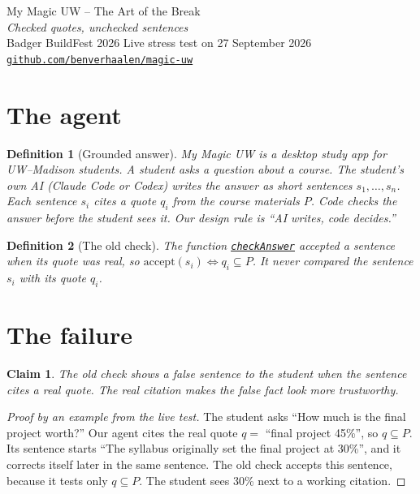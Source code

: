 \documentclass[10pt]{article}
\theoremstyle{card}
\newtheorem{definition}{Definition}
\newtheorem{claim}{Claim}
\newcommand{\repo}{https://github.com/benverhaalen/magic-uw/blob/9fe2f848144c6ff58830d6c5c870277833a679a3}
\newcommand{\gh}[2]{\href{\repo/#1}{\underline{\texttt{#2}}}}
\begin{document}
\small

\begin{center}
{\Large My Magic UW -- The Art of the Break}\\[3pt]
{\itshape Checked quotes, unchecked sentences}\\[2pt]
{\footnotesize Badger BuildFest 2026 \quad Live stress test on 27 September 2026 \quad \href{https://github.com/benverhaalen/magic-uw}{\underline{\texttt{github.com/benverhaalen/magic-uw}}}}
\end{center}

\section{The agent}

\begin{definition}[Grounded answer]
My Magic UW is a desktop study app for UW--Madison students. A student asks a question about a course. The student's own AI (Claude Code or Codex) writes the answer as short sentences $s_1,\dots,s_n$. Each sentence $s_i$ cites a quote $q_i$ from the course materials $P$. Code checks the answer before the student sees it. Our design rule is ``AI writes, code decides.''
\end{definition}

\begin{definition}[The old check]
The function \gh{packages/core/src/intent/ask.ts\#L474}{checkAnswer} accepted a sentence when its quote was real, so $\text{accept}(s_i) \iff q_i \subseteq P$. It never compared the sentence $s_i$ with its quote $q_i$.
\end{definition}

\section{The failure}

\begin{claim}
The old check shows a false sentence to the student when the sentence cites a real quote. The real citation makes the false fact look more trustworthy.
\end{claim}

\vspace{-5pt}\begin{proof}[Proof by an example from the live test]
The student asks ``How much is the final project worth?'' Our agent cites the real quote $q =$ ``final project 45\%'', so $q \subseteq P$. Its sentence starts ``The syllabus originally set the final project at 30\%'', and it corrects itself later in the same sentence. The old check accepts this sentence, because it tests only $q \subseteq P$. The student sees 30\% next to a working citation.
\end{proof}
\vspace{-5pt}
\end{document}
